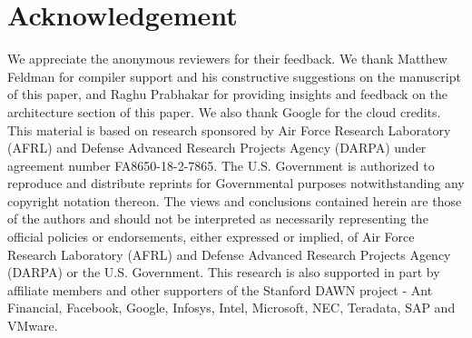 \section{Acknowledgement}

We appreciate the anonymous reviewers for their feedback.
We thank Matthew Feldman for compiler support
  and his constructive suggestions on the manuscript of this paper,
  and Raghu Prabhakar for providing insights and
  feedback on the architecture section of this paper.
We also thank Google for the cloud credits.
This material is based on research sponsored by Air Force Research Laboratory (AFRL) and Defense
Advanced Research Projects Agency (DARPA) under agreement number FA8650-18-2-7865. The U.S.
Government is authorized to reproduce and distribute reprints for Governmental purposes
notwithstanding any copyright notation thereon. The views and conclusions contained herein are those
of the authors and should not be interpreted as necessarily representing the official policies or
endorsements, either expressed or implied, of Air Force Research Laboratory (AFRL) and Defense
Advanced Research Projects Agency (DARPA) or the U.S. Government.
This research is also supported in part by affiliate members and other supporters of the
Stanford DAWN project - Ant Financial, Facebook, Google, Infosys, Intel, Microsoft, NEC, Teradata,
SAP and VMware.